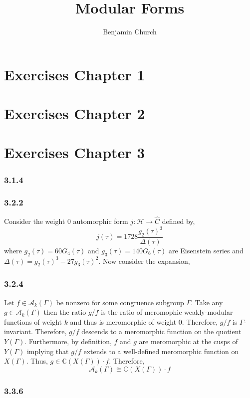 \documentclass{article}
\title{Modular Forms}
\author{Benjamin Church}
\newcommand{\C}{\mathbb{C}}
\theoremstyle{definition}
\newcommand{\A}[1]{\mathcal{A}_{#1}}
\newcommand{\half}{\mathcal{H}}
\begin{document}
\maketitle

\section{Exercises Chapter 1}

\section{Exercises Chapter 2}


\section{Exercises Chapter 3}

\subsubsection*{3.1.4}

\subsubsection*{3.2.2}
Consider the weight $0$ automorphic form $j : \half \to \hat{C}$ defined by,
\[ j(\tau) = 1728 \frac{g_2(\tau)^3}{\Delta(\tau)} \]
where $g_2(\tau) = 60 G_4(\tau)$ and $g_3(\tau) = 140 G_6(\tau)$ are Eisenstein series and $\Delta(\tau) = g_2(\tau)^3 - 27 g_3(\tau)^2$. Now consider the expansion,  

\subsubsection*{3.2.4}

Let $f \in \A{k}(\Gamma)$ be nonzero for some congruence subgroup $\Gamma$. Take any $g \in \A{k}(\Gamma)$ then the ratio $g / f$ is the ratio of meromophic weakly-modular functions of weight $k$ and thus is meromorphic of weight $0$. Therefore, $g / f$ is $\Gamma$-invariant. Therefore, $g / f$ descends to a meromorphic function on the quotient $Y(\Gamma)$. Furthermore, by definition, $f$ and $g$ are meromorphic at the cusps of $Y(\Gamma)$ implying that $g / f$ extends to a well-defined meromorphic function on $X(\Gamma)$. Thus, $g \in \C(X(\Gamma)) \cdot f$. Therefore,
\[ \A{k}(\Gamma) \cong \C(X(\Gamma)) \cdot f \]

\subsubsection*{3.3.6}
\end{document}
